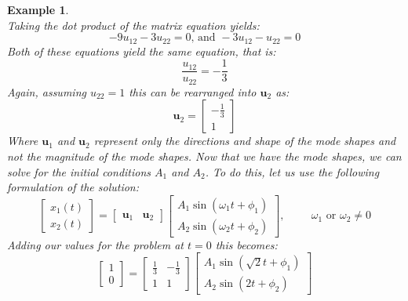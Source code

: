 \documentclass[12pt,letter]{article}
\newtheorem{ex}{Example}
\numberwithin{ex}{section} %
\newenvironment{example}{\begin{mdframed}[middlelinewidth=0.5mm]\begin{ex}\normalfont}{\end{ex}\end{mdframed}}
\numberwithin{re}{section} %
\begin{document}
\begin{example}
\begin{equation}
\end{equation}
Taking the dot product of the matrix equation yields:
\begin{equation}
	-9u_{12} -3u_{22}=0 \text{, and } -3u_{12} - u_{22}=0
\end{equation}
Both of these equations yield the same equation, that is:
\begin{equation}
	\frac{u_{12}}{u_{22}} =-\frac{1}{3}
\end{equation}
Again, assuming $u_{22}=1$  this can be rearranged into $\textbf{u}_2$ as:
\begin{equation}
	 \textbf{u}_2 = \begin{bmatrix} -\frac{1}{3}\\ 1\end{bmatrix}
\end{equation}
Where $\mathbf{u}_1$ and $\mathbf{u}_2$ represent only the directions and shape of the mode shapes and not the magnitude of the mode shapes. 
Now that we have the mode shapes, we can solve for the initial conditions $A_1$ and $A_2$. To do this, let us use the following formulation of the solution:
\begin{equation}
	 \begin{bmatrix} x_1(t) \\  x_2(t) \end{bmatrix} =  \begin{bmatrix} \mathbf{u}_1 & \mathbf{u}_2 \end{bmatrix}
	 \begin{bmatrix} A_1 \sin (\omega_1 t + \phi_1 )\\ A_2 \sin (\omega_2 t + \phi_2 )\end{bmatrix}, \hspace{1cm} \omega_1 \text{ or } \omega_2 \neq 0
\end{equation}
Adding our values for the problem at $t=0$ this becomes:
\begin{equation}
	 \begin{bmatrix} 1 \\  0 \end{bmatrix} =  \begin{bmatrix} \frac{1}{3} & -\frac{1}{3} \\ 1 & 1 \end{bmatrix}
	 \begin{bmatrix} A_1 \sin (\sqrt{2} t + \phi_1 )\\ A_2 \sin (2 t + \phi_2 )\end{bmatrix}
\end{equation}

\end{example}
\end{document}
